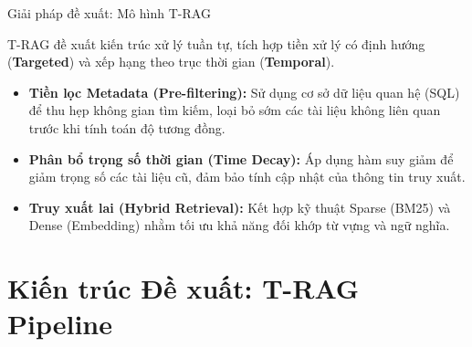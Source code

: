 \documentclass[aspectratio=169, xcolor=table]{beamer}
\begin{document}
\begin{frame}{Giải pháp đề xuất: Mô hình T-RAG}
    \begin{successbox}
        \small T-RAG đề xuất kiến trúc xử lý tuần tự, tích hợp tiền xử lý có định hướng (\textbf{Targeted}) và xếp hạng theo trục thời gian (\textbf{Temporal}).
    \end{successbox}
    
    \vspace{0.3cm}
    
    \begin{itemize}
        \item \textbf{Tiền lọc Metadata (Pre-filtering):} Sử dụng cơ sở dữ liệu quan hệ (SQL) để thu hẹp không gian tìm kiếm, loại bỏ sớm các tài liệu không liên quan trước khi tính toán độ tương đồng.
        \item \textbf{Phân bổ trọng số thời gian (Time Decay):} Áp dụng hàm suy giảm để giảm trọng số các tài liệu cũ, đảm bảo tính cập nhật của thông tin truy xuất.
        \item \textbf{Truy xuất lai (Hybrid Retrieval):} Kết hợp kỹ thuật Sparse (BM25) và Dense (Embedding) nhằm tối ưu khả năng đối khớp từ vựng và ngữ nghĩa.
    \end{itemize}
\end{frame}


\section{Kiến trúc Đề xuất: T-RAG Pipeline}
\end{document}
